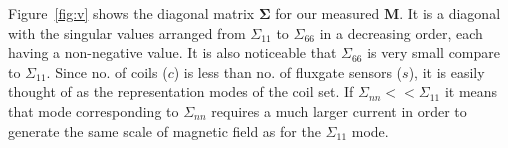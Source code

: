 


 
Figure~\ref{fig:v} shows the diagonal matrix $\bm{\Sigma}$ for our measured $\bm{M}$. It is a diagonal with the singular values arranged from $\Sigma_{11}$ to $\Sigma_{66}$ in a decreasing order, each having a non-negative value. It is also noticeable that $\Sigma_{66}$ is very small compare to $\Sigma_{11}$. Since no. of coils ($c$) is less than no. of fluxgate sensors ($s$), it is easily thought of as the representation modes of the coil set. If $\Sigma_{nn}<<\Sigma_{11}$ it means that mode corresponding to  $\Sigma_{nn}$ requires a much larger current in order to generate the same scale of magnetic field as for the $\Sigma_{11}$ mode. 


